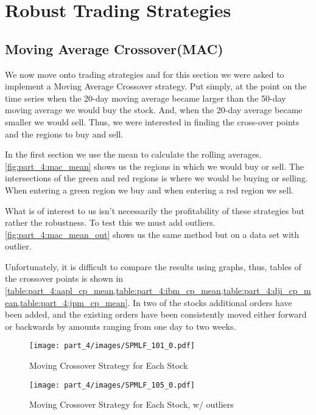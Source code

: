 \section{Robust Trading Strategies}
\subsection{Moving Average Crossover(MAC)}

We now move onto trading strategies and for this section we were asked to implement a Moving Average Crossover strategy. Put simply, at the point on the time series when the 20-day moving average became larger than the 50-day moving average we would buy the stock. And, when the 20-day average became smaller we would sell. Thus, we were interested in finding the cross-over points and the regions to buy and sell. 

In the first section we use the mean to calculate the rolling averages. \autoref{fig:part_4:mac_mean} shows us the regions in which we would buy or sell. The intersections of the green and red regions is where we would be buying or selling. When entering a green region we buy and when entering a red region we sell. 

What is of interest to us isn't necessarily the profitability of these strategies but rather the robustness. To test this we must add outliers. \autoref{fig:part_4:mac_mean_out} shows us the same method but on a data set with outlier. 

Unfortunately, it is difficult to compare the results using graphs, thus, tables of the crossover points is shown in \cref{table:part_4:aapl_cp_mean,table:part_4:ibm_cp_mean,table:part_4:dji_cp_mean,table:part_4:jpm_cp_mean}. In two of the stocks additional orders have been added, and the existing orders have been consistently moved either forward or backwards by amounts ranging from one day to two weeks.

\begin{figure}[!htb]
    \centering
    \texttt{[image: part\_4/images/SPMLF\_101\_0.pdf]}
    \caption{Moving Crossover Strategy for Each Stock}
    \label{fig:part_4:mac_mean}
\end{figure}

\begin{figure}[!htb]
    \centering
    \texttt{[image: part\_4/images/SPMLF\_105\_0.pdf]}
    \caption{Moving Crossover Strategy for Each Stock, w/ outliers}
    \label{fig:part_4:mac_mean_out}
\end{figure}

